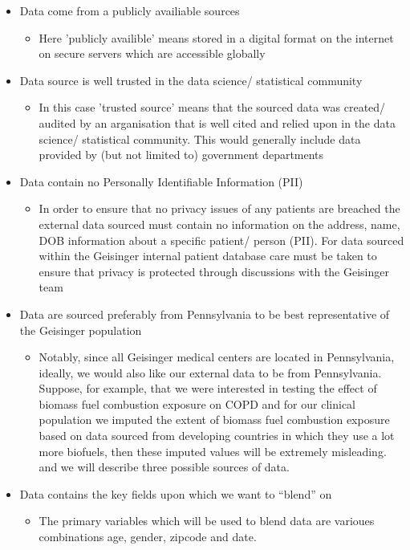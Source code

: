 \documentclass{article}
\begin{document}
\begin{itemize}
  \item Data come from a publicly availiable sources
  \begin{itemize}
    \item Here 'publicly availible' means stored in a digital format on the 
          internet on secure servers which are accessible globally
  \end{itemize}
  \item Data source is well trusted in the data science/ statistical community
  \begin{itemize}
    \item In this case 'trusted source' means that the sourced data was created/ 
          audited by an arganisation that is well cited and relied upon in the 
          data science/ statistical community. This would generally include data
          provided by (but not limited to) government departments
  \end{itemize}
  \item Data contain no Personally Identifiable Information (PII)
  \begin{itemize}
    \item In order to ensure that no privacy issues of any patients are breached
          the external data sourced must contain no information on the address, 
          name, DOB information about a specific patient/ person (PII). For data sourced  
          within the Geisinger internal patient database care must be taken to 
          ensure that privacy is protected through discussions with the Geisinger
          team  
  \end{itemize}
  \item Data are sourced preferably from Pennsylvania to be best representative 
        of the Geisinger population
  \begin{itemize}
    \item Notably, since all Geisinger medical centers are located in 
          Pennsylvania, ideally, we would also like our external data to be from 
          Pennsylvania. Suppose, for example, that we were interested in testing 
          the effect of biomass fuel combustion exposure on COPD and for our 
          clinical population we imputed the extent of biomass fuel combustion 
          exposure based on data sourced from developing countries in which 
          they use a lot more biofuels, then these imputed values will be 
          extremely misleading. and we will describe three possible sources 
          of data.  
  \end{itemize}
  \item Data contains the key fields upon which we want to “blend” on
  \begin{itemize}
    \item The primary variables which will be used to blend data are varioues 
          combinations age, gender, zipcode and date.
  \end{itemize}
\end{itemize}
\end{document}
